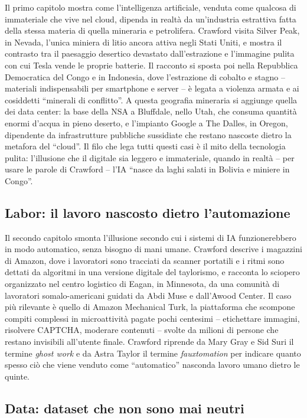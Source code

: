 \documentclass[a4paper,11pt]{article}
\begin{document}
Il primo capitolo mostra come l'intelligenza artificiale, venduta come qualcosa di immateriale che vive nel cloud, dipenda in realtà da un'industria estrattiva fatta della stessa materia di quella mineraria e petrolifera. Crawford visita Silver Peak, in Nevada, l'unica miniera di litio ancora attiva negli Stati Uniti, e mostra il contrasto tra il paesaggio desertico devastato dall'estrazione e l'immagine pulita con cui Tesla vende le proprie batterie. Il racconto si sposta poi nella Repubblica Democratica del Congo e in Indonesia, dove l'estrazione di cobalto e stagno -- materiali indispensabili per smartphone e server -- è legata a violenza armata e ai cosiddetti ``minerali di conflitto''. A questa geografia mineraria si aggiunge quella dei data center: la base della NSA a Bluffdale, nello Utah, che consuma quantità enormi d'acqua in pieno deserto, e l'impianto Google a The Dalles, in Oregon, dipendente da infrastrutture pubbliche sussidiate che restano nascoste dietro la metafora del ``cloud''. Il filo che lega tutti questi casi è il mito della tecnologia pulita: l'illusione che il digitale sia leggero e immateriale, quando in realtà -- per usare le parole di Crawford -- l'IA ``nasce da laghi salati in Bolivia e miniere in Congo''.

\subsection{Labor: il lavoro nascosto dietro l'automazione}

Il secondo capitolo smonta l'illusione secondo cui i sistemi di IA funzionerebbero in modo automatico, senza bisogno di mani umane. Crawford descrive i magazzini di Amazon, dove i lavoratori sono tracciati da scanner portatili e i ritmi sono dettati da algoritmi in una versione digitale del taylorismo, e racconta lo sciopero organizzato nel centro logistico di Eagan, in Minnesota, da una comunità di lavoratori somalo-americani guidati da Abdi Muse e dall'Awood Center. Il caso più rilevante è quello di Amazon Mechanical Turk, la piattaforma che scompone compiti complessi in microattività pagate pochi centesimi -- etichettare immagini, risolvere CAPTCHA, moderare contenuti -- svolte da milioni di persone che restano invisibili all'utente finale. Crawford riprende da Mary Gray e Sid Suri il termine \emph{ghost work} e da Astra Taylor il termine \emph{fauxtomation} per indicare quanto spesso ciò che viene venduto come ``automatico'' nasconda lavoro umano dietro le quinte.

\subsection{Data: dataset che non sono mai neutri}
\end{document}
